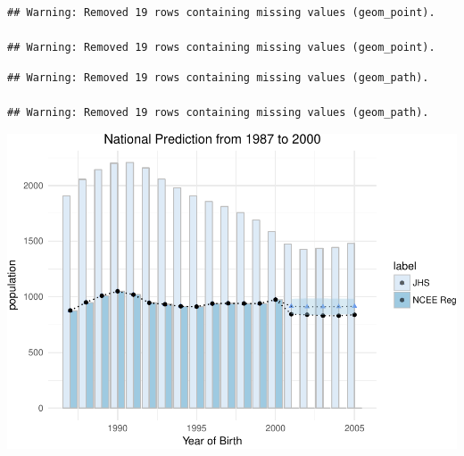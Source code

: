\documentclass[]{article}
\begin{document}
\begin{verbatim}
## Warning: Removed 19 rows containing missing values (geom_point).

## Warning: Removed 19 rows containing missing values (geom_point).
\end{verbatim}

\begin{verbatim}
## Warning: Removed 19 rows containing missing values (geom_path).

## Warning: Removed 19 rows containing missing values (geom_path).
\end{verbatim}

\includegraphics{NCEE_files/figure-latex/unnamed-chunk-6-1.pdf}
\end{document}
